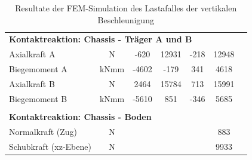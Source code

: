 \begin{table}[H]
\begin{tabular}{lcccccc}
  \multicolumn{5}{l}{\textbf{Kontaktreaktion: Chassis - Träger A und B}}									&		&		\\	\thickhline
   Axialkraft A	&	N	&	-620	&	12931	&	-218	&	12948	&		\\
  Biegemoment A	&	kNmm	&	-4602	&	-179	&	341	&	4618	&		\\
  Axialkraft B	&	N	&	2464	&	15784	&	713	&	15991	&		\\
  Biegemoment B	&	kNmm	&	-5610	&	851	&	-346	&	5685	&		\\	\hline	\\
  \multicolumn{5}{l}{\textbf{Kontaktreaktion: Chassis - Boden}}									&		&		\\	\thickhline
  Normalkraft (Zug)	&	N	&		&		&		&	883	&		\\
  Schubkraft (xz-Ebene)	&	N	&		&		&		&	9933	&		\\	\hline
  \end{tabular}
  \caption{Resultate der FEM-Simulation des Lastafalles der vertikalen Beschleunigung}
  \label{tab:FEM 1.1}
  \end{table}

